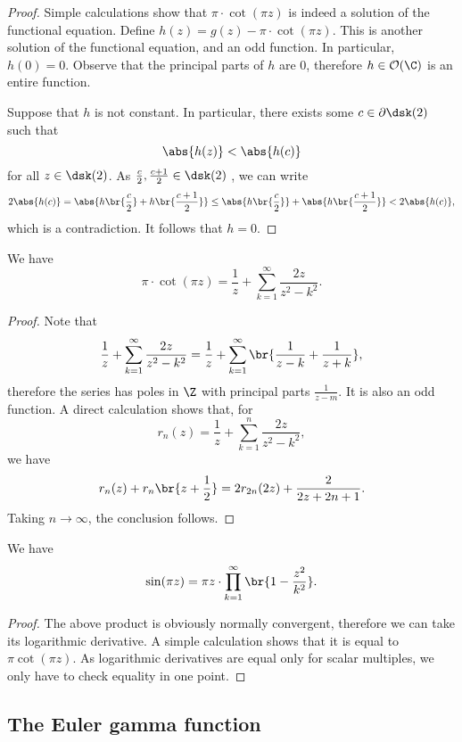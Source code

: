 \begin{proof}
Simple calculations show that $\pi \cdot \cot(\pi z)$ is indeed a
solution of the functional equation. Define
$h(z) = g(z) - \pi \cdot \cot(\pi z)$. This is another solution of
the functional equation, and an odd function. In particular,
$h(0) = 0$. Observe that the principal parts of $h$ are $0$,
therefore $h \in \mathcal{O}(\C)$ is an entire function.

Suppose that $h$ is not constant. In particular, there exists some
$c \in \partial \dsk(2)$ such that
\[
\abs{h(z)} < \abs{h(c)}
\]
for all $z \in \dsk(2)$. As
$\frac{c}{2}, \frac{c+1}{2} \in \dsk(2)$ , we can write
\[
2 \abs{h(c)} =
\abs{h \br{\frac{c}{2}} + h \br{\frac{c+1}{2}}} \leq
\abs{h \br{\frac{c}{2}}} + \abs{h \br{\frac{c+1}{2}}} <
2 \abs{h(c)},
\]
which is a contradiction. It follows that $h = 0$.
\end{proof}

\begin{posledica}
We have
\[
\pi \cdot \cot(\pi z) =
\frac{1}{z} + \sum_{k=1}^\infty \frac{2z}{z^2 - k^2}.
\]
\end{posledica}

\begin{proof}
Note that
\[
\frac{1}{z} + \sum_{k=1}^\infty \frac{2z}{z^2 - k^2} =
\frac{1}{z} + \sum_{k=1}^\infty \br{\frac{1}{z-k} + \frac{1}{z+k}},
\]
therefore the series has poles in $\Z$ with principal parts
$\frac{1}{z-m}$. It is also an odd function. A direct calculation
shows that, for
\[
r_n(z) = \frac{1}{z} + \sum_{k=1}^n \frac{2z}{z^2 - k^2},
\]
we have
\[
r_n(z) + r_n \br{z + \frac{1}{2}} =
2 r_{2n}(2z) + \frac{2}{2z + 2n + 1}.
\]
Taking $n \to \infty$, the conclusion follows.
\end{proof}

\begin{izrek}
We have
\[
\sin(\pi z) =
\pi z \cdot \prod_{k=1}^\infty \br{1 - \frac{z^2}{k^2}}.
\]
\end{izrek}

\begin{proof}
The above product is obviously normally convergent, therefore we
can take its logarithmic derivative. A simple calculation shows
that it is equal to $\pi \cot(\pi z)$. As logarithmic derivatives
are equal only for scalar multiples, we only have to check equality
in one point.
\end{proof}

\newpage

\subsection{The Euler gamma function}

